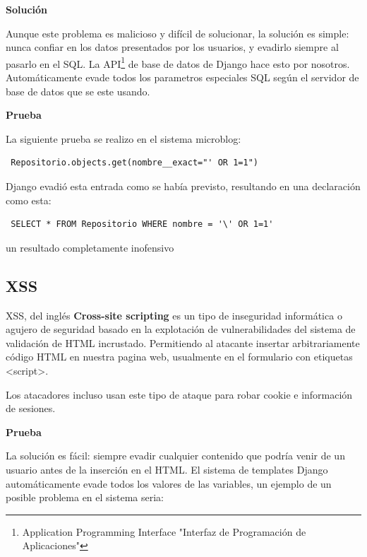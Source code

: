 \textbf{Solución}

Aunque este problema es malicioso y difícil de solucionar, la solución es simple: nunca confiar en los datos presentados por los usuarios, y evadirlo siempre al pasarlo en el SQL.
La API\footnote{Application Programming Interface "Interfaz de Programación de Aplicaciones"} de base de datos de Django hace esto por nosotros. Automáticamente evade todos los parametros especiales SQL según el servidor de base de datos que se este usando.

\textbf{Prueba}

La siguiente prueba se realizo en el sistema microblog:

\begin{verbatim}
 Repositorio.objects.get(nombre__exact="' OR 1=1")
\end{verbatim}

Django evadió esta entrada como se había previsto, resultando en una declaración como esta:

\begin{verbatim}
 SELECT * FROM Repositorio WHERE nombre = '\' OR 1=1'
\end{verbatim}

un resultado completamente inofensivo 

\subsection{XSS}

XSS, del inglés \textbf{Cross-site scripting} es un tipo de inseguridad informática o agujero de seguridad basado en la explotación de vulnerabilidades del sistema de validación de HTML incrustado. Permitiendo al atacante insertar arbitrariamente código HTML en nuestra pagina web, usualmente en el formulario con etiquetas <script>.

Los atacadores incluso usan este tipo de ataque para robar cookie e información de sesiones.

\textbf{Prueba}

La solución es fácil: siempre evadir cualquier contenido que podría venir de un usuario antes de la inserción en el HTML. 
El sistema de templates Django automáticamente evade todos los valores de las variables, un ejemplo de un posible problema en el sistema seria:

